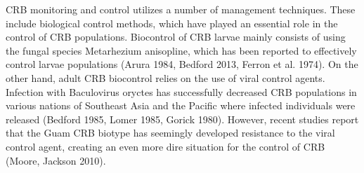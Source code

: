 \documentclass[11pt,letterpaper]{scrartcl}
\begin{document}
CRB monitoring and control utilizes a number of management techniques. These include biological control methods, which have played an essential role in the control of CRB populations. Biocontrol of CRB larvae mainly consists of using the fungal species Metarhezium anisopline, which has been reported to effectively control larvae populations (Arura 1984, Bedford 2013, Ferron et al. 1974). On the other hand, adult CRB biocontrol relies on the use of viral control agents. Infection with Baculovirus oryctes has successfully decreased CRB populations in various nations of Southeast Asia and the Pacific where infected individuals were released (Bedford 1985, Lomer 1985, Gorick 1980). However, recent studies report that the Guam CRB biotype has seemingly developed resistance to the viral control agent, creating an even more dire situation for the control of CRB (Moore, Jackson 2010). 
\end{document}
